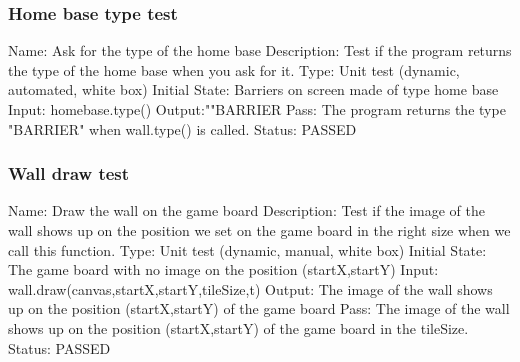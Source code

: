 \documentclass{article}
\begin{document}
\subsubsection{Home base type test}
\label{sec:3.2.3}
Name:  Ask for the type of the home base\newline
Description: Test if the program returns the type of the home base when you ask
 for it. \newline
Type: Unit test (dynamic, automated, white box) \newline
Initial State:  Barriers on screen made of type home base \newline
Input: homebase.type()\newline
Output:""BARRIER \newline
Pass:  The program returns the type "BARRIER" when wall.type() is called. 
\newline
\newline Status: PASSED

\subsubsection{Wall draw test}
\label{sec:3.2.4}
Name:  Draw the wall on the game board\newline
Description: Test if the image of the wall shows up on the position we set on
 the game board in the right size when we call this function. \newline
Type: Unit test (dynamic, manual, white box) \newline
Initial State:  The game board with no image on the position (startX,startY) 
\newline
Input: wall.draw(canvas,startX,startY,tileSize,t)\newline
Output: The image of the wall shows up on the position (startX,startY) of the 
game board\newline
Pass:  The image of the wall shows up on the position (startX,startY) of the 
game board in the tileSize. \newline
\newline Status: PASSED
\end{document}
